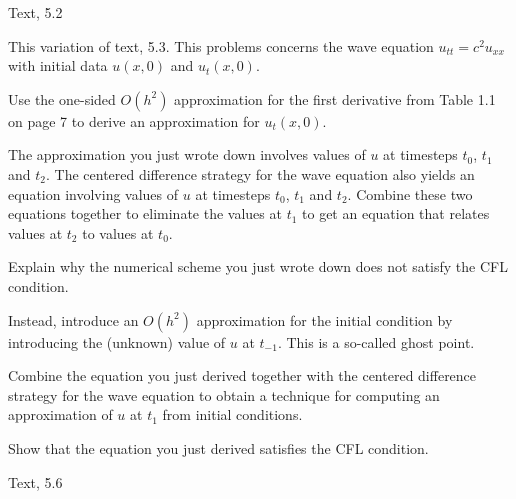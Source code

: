 \documentclass[minion]{homework}
\begin{document}
\begin{problems}

\problem  Text, 5.2

\problem  This variation of text, 5.3.  This problems concerns the wave equation $u_{tt}=c^2u_{xx}$ with initial data $u(x,0)$ and $u_t(x,0)$.
\begin{subproblems}
\item  Use the one-sided $O(h^2)$ approximation for the first
derivative from Table 1.1 on page 7 to derive an approximation for $u_t(x,0)$.
\item The approximation you just wrote down involves values of $u$ at timesteps $t_0$, $t_1$ and $t_2$.  The centered difference strategy for the wave equation also yields an equation involving values of $u$ at
timesteps $t_0$, $t_1$ and $t_2$.  Combine these two equations together 
to eliminate the values at $t_1$ to get an equation that relates values at $t_2$ to values at $t_0$.
\item Explain why the numerical scheme you just wrote down does not satisfy the CFL condition.
\item Instead, introduce an $O(h^2)$ approximation for the initial condition by introducing the (unknown) value of $u$ at $t_{-1}$.  This is a so-called ghost point.
\item Combine the equation you just derived together with the 
centered difference strategy for the wave equation to obtain a technique
for computing an approximation of $u$ at $t_1$ from initial conditions.  
\item Show that the equation you just derived satisfies the CFL condition.
\end{subproblems}




\problem  Text, 5.6

\end{problems}
\end{document}
